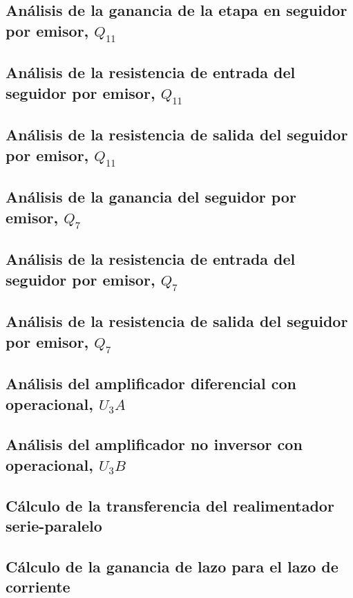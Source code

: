 

\subsection{Análisis de la ganancia de la etapa en seguidor por emisor, $Q_{11}$}

\subsection{Análisis de la resistencia de entrada del seguidor por emisor, $Q_{11}$}

\subsection{Análisis de la resistencia de salida del seguidor por emisor, $Q_{11}$}

\subsection{Análisis de la ganancia del seguidor por emisor, $Q_{7}$}

\subsection{Análisis de la resistencia de entrada del seguidor por emisor, $Q_{7}$}

\subsection{Análisis de la resistencia de salida del seguidor por emisor, $Q_{7}$}

\subsection{Análisis del amplificador diferencial con operacional, $U_{3}A$}

\subsection{Análisis del amplificador no inversor con operacional, $U_{3}B$}

\subsection{Cálculo de la transferencia del realimentador serie-paralelo}

\subsection{Cálculo de la ganancia de lazo para el lazo de corriente}

